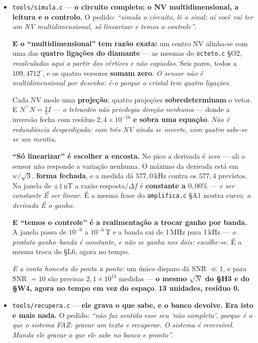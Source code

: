 \documentclass[11pt]{article}
\newcommand{\code}[1]{\texttt{\small #1}}
\theoremstyle{plain}
\theoremstyle{remark}
\begin{document}
\begin{itemize}
E a cadeia inteira mede-se ponta a ponta: SNR $417 \to 317$, e \emph{o que o encanamento tira está
escrito num número só --- o $F$.} \textbf{Um cano bom não melhora a água.} \textbf{15 unidades,
resíduo 0.}


\item \code{tools/simula.c} --- \textbf{o circuito completo: o NV multidimensional, a leitura e o
controlo.} O pedido: \emph{``simula o circuito, lê o sinal; aí você vai ter um NV multidimensional,
só linearizar e temos o controle''}.

\textbf{E o ``multidimensional'' tem razão exata:} um centro NV alinha-se com uma das \textbf{quatro
ligações do diamante} --- as mesmas do \code{octeto.c} §O2, \emph{recalculadas aqui a partir dos
vértices e não copiadas}. Seis pares, todos a $109{,}4712^\circ$, e os quatro versores \textbf{somam
zero}. \emph{O sensor não é multidimensional por desenho: é-o porque o cristal tem quatro ligações.}

Cada NV mede uma \textbf{projeção}; quatro projeções \textbf{sobredeterminam} o vetor. E
$N^{\!\top}\!N = \tfrac43 I$ --- \emph{o tetraedro não privilegia direção nenhuma} --- donde a
inversão fecha com resíduo $2{,}4\times10^{-16}$ \textbf{e sobra uma equação}. \emph{Não é
redundância desperdiçada: com três NV ainda se inverte, com quatro sabe-se se um mentiu.}

\textbf{``Só linearizar'' é escolher a encosta.} No pico a derivada é \emph{zero} --- ali o sensor
não responde a variação nenhuma. O máximo da derivada está em $w/\sqrt3$, \textbf{forma fechada}, e
a medida dá $577{,}0$\,kHz contra os $577{,}4$ previstos. Na janela de $\pm1$\,nT a razão
resposta$/\Delta f$ é \textbf{constante a $0{,}00\%$} --- \emph{e ser constante É ser linear}. É a
mesma frase do \code{amplifica.c} §A1 noutra curva: \emph{a derivada É o ganho}.

\textbf{E ``temos o controle'' é a realimentação a trocar ganho por banda.} A janela passa de
$10^{-9}$ a $10^{-6}$\,T e a banda cai de 1\,MHz para 1\,kHz --- \emph{o produto ganho--banda é
constante, e não se ganha nos dois: escolhe-se}. É a mesma troca do §L6, agora no tempo.

\emph{E a conta honesta do ponta a ponta:} um único disparo dá SNR $\ll 1$, e para SNR $=10$ são
precisas $2{,}1\times10^{14}$ medidas --- \textbf{o mesmo $\sqrt N$ do §H3 e do §W4, agora no tempo
em vez do espaço}. \textbf{13 unidades, resíduo 0.}


\item \code{tools/recupera.c} --- \textbf{ele grava o que sabe, e o banco devolve. Era isto e mais
nada.} O pedido: \emph{``não faz sentido esse seu `não completa', porque é o que o sistema FAZ:
gravar um texto e recuperar. O sistema é reversível. Manda ele gravar o que ele sabe no banco e
pronto''}.


\end{itemize}
\end{document}
